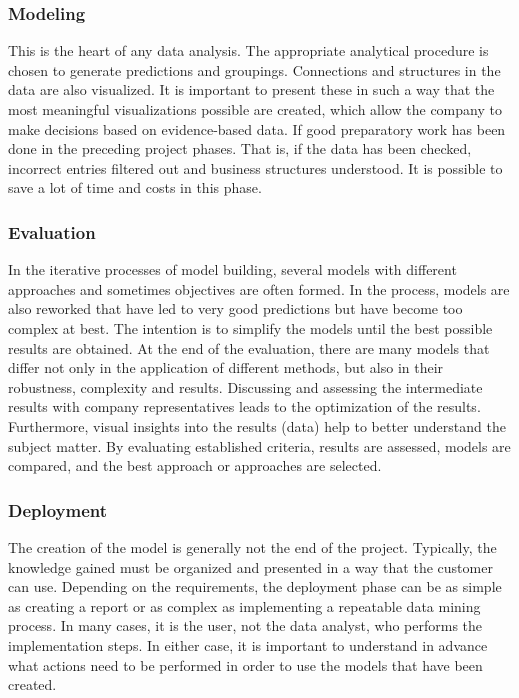 \subsubsection{Modeling}
This is the heart of any data analysis. The appropriate analytical procedure is chosen to generate
predictions and groupings. Connections and structures in the data are also visualized. 
It is important to present these in such a way that the most meaningful visualizations
possible are created, which allow the company to make decisions based on evidence-based data. 
If good preparatory work has been done in the preceding project phases.
That is, if the data has been checked, incorrect entries filtered out and business structures understood. 
It is possible to save a lot of time and costs in this phase.

\subsubsection{Evaluation}
In the iterative processes of model building, several models with different approaches and sometimes
objectives are often formed. 
In the process, models are also reworked that have led to very good predictions but have become
too complex at best. 
The intention is to simplify the models until the best possible results are obtained. 
At the end of the evaluation, there are many models that differ not only in the application
of different methods, but also in their robustness, complexity and results. 
Discussing and assessing the intermediate results with company representatives leads to
the optimization of the results. 
Furthermore, visual insights into the results (data) help to better understand the subject matter. 
By evaluating established criteria, results are assessed, models are compared,
and the best approach or approaches are selected.

\subsubsection{Deployment}
The creation of the model is generally not the end of the project.
Typically, the knowledge gained must be organized and presented in a way that the customer can use. 
Depending on the requirements, the deployment phase can be as simple as creating a report or
as complex as implementing a repeatable data mining process. 
In many cases, it is the user, not the data analyst, who performs the implementation steps. 
In either case, it is important to understand in advance what actions need to be performed in
order to use the models that have been created.